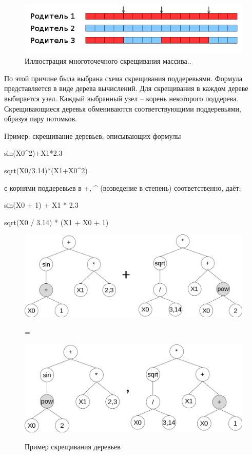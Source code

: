 \begin{figure}[!h]
\centering
\includegraphics[scale=0.7]{research/pics/1.png}
\caption{Иллюстрация многоточечного скрещивания массива..}
\label{figure:arrayCrossover}
\end{figure}


По этой причине была выбрана схема скрещивания поддеревьями. Формула представляется в виде дерева вычислений. Для скрещивания в каждом дереве выбирается узел. Каждый выбранный узел – корень некоторого поддерева. Скрещивающиеся деревья обмениваются соответствующими поддеревьями, образуя пару потомков.

Пример: скрещивание деревьев, описывающих формулы 

  sin(X0^2)+X1*2.3

  sqrt(X0/3.14)*(X1+X0^2)

с корнями поддеревьев в +, \^{} (возведение в степень) соответственно, даёт:

  sin(X0 + 1) + X1 * 2.3

  sqrt(X0 / 3.14) * (X1 + X0 + 1)

\clearpage
\begin{figure}[!h]
\centering
\includegraphics[scale=0.5]{research/pics/2.png}

=

\includegraphics[scale=0.5]{research/pics/3.png}
\label{figure:crossover}
\caption{Пример скрещивания деревьев}
\end{figure}

